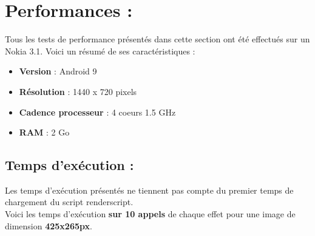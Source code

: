 \section{Performances :}
Tous les tests de performance présentés dans cette section ont été effectués sur un Nokia 3.1.
Voici un résumé de ses caractéristiques :
\begin{itemize} [label=\textbullet]
  \item \textbf{Version} : Android 9
  \item \textbf{Résolution}	: 1440 x 720 pixels
  \item \textbf{Cadence processeur} : 4 coeurs 1.5 GHz
  \item \textbf{RAM} : 2 Go
\end{itemize}

\subsection{Temps d'exécution :}

Les temps d'exécution présentés ne tiennent pas compte du premier temps de chargement du script renderscript.
\\

Voici les temps d'exécution \textbf{sur 10 appels} de chaque effet pour une image de dimension \textbf{425x265px}.
\\

